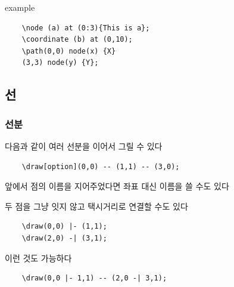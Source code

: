 \documentclass[12pt]{beamer}
\begin{document}
\begin{frame}[fragile]{\secname}{example}
	\begin{lstlisting}
	\node (a) at (0:3){This is a};
	\coordinate (b) at (0,10);
	\path(0,0) node(x) {X}
	(3,3) node(y) {Y};
	\end{lstlisting}
	
	\begin{center}
	\end{center}
	
\end{frame}


\subsection{선}

\subsubsection{선분}
\begin{frame}[fragile]{\secname}{\subsecname}
	다음과 같이 여러 선분을 이어서 그릴 수 있다
	\begin{lstlisting}
	\draw[option](0,0) -- (1,1) -- (3,0);
	\end{lstlisting}
	
	
	\vfill
	앞에서 점의 이름을 지어주었다면 좌표 대신 이름을 쓸 수도 있다
\end{frame}
\begin{frame}[fragile]{\secname}{\subsecname}
	두 점을 그냥 잇지 않고 택시거리로 연결할 수도 있다
	\begin{lstlisting}
	\draw(0,0) |- (1,1);
	\draw(2,0) -| (3,1);
	\end{lstlisting}
	
	
	\vfill
	이런 것도 가능하다
	\begin{lstlisting}
	\draw(0,0 |- 1,1) -- (2,0 -| 3,1);
	\end{lstlisting}
	
\end{frame}
\end{document}
